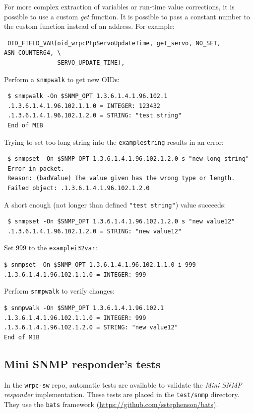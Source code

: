 \documentclass[a4paper, 12pt]{article}
\renewcommand{\_}{\underscore\allowbreak}
\begin{document}
\begin{itemize*}
For more complex extraction of variables or run-time value corrections,
it is possible to use a custom \textit{get} function. It is possible to pass
a constant number to the custom function instead of an address. For example:
\begin{lstlisting}
 OID_FIELD_VAR(oid_wrpcPtpServoUpdateTime, get_servo, NO_SET, ASN_COUNTER64, \
               SERVO_UPDATE_TIME),
\end{lstlisting}

\end{itemize*}
Perform a \texttt{snmpwalk} to get new OIDs:
\begin{lstlisting}
 $ snmpwalk -On $SNMP_OPT 1.3.6.1.4.1.96.102.1
 .1.3.6.1.4.1.96.102.1.1.0 = INTEGER: 123432
 .1.3.6.1.4.1.96.102.1.2.0 = STRING: "test string"
 End of MIB
\end{lstlisting}
Trying to set too long string into the \texttt{example\_string} results in an error:
\begin{lstlisting}
 $ snmpset -On $SNMP_OPT 1.3.6.1.4.1.96.102.1.2.0 s "new long string"
 Error in packet.
 Reason: (badValue) The value given has the wrong type or length.
 Failed object: .1.3.6.1.4.1.96.102.1.2.0
\end{lstlisting}
A short enough (not longer than defined \texttt{"test string"}) value succeeds:
\begin{lstlisting}
 $ snmpset -On $SNMP_OPT 1.3.6.1.4.1.96.102.1.2.0 s "new value12"
 .1.3.6.1.4.1.96.102.1.2.0 = STRING: "new value12"
\end{lstlisting}
Set 999 to the \texttt{example\_i32var}:
\begin{lstlisting}
$ snmpset -On $SNMP_OPT 1.3.6.1.4.1.96.102.1.1.0 i 999
.1.3.6.1.4.1.96.102.1.1.0 = INTEGER: 999
\end{lstlisting}
Perform \texttt{snmpwalk} to verify changes:
\begin{lstlisting}
$ snmpwalk -On $SNMP_OPT 1.3.6.1.4.1.96.102.1
.1.3.6.1.4.1.96.102.1.1.0 = INTEGER: 999
.1.3.6.1.4.1.96.102.1.2.0 = STRING: "new value12"
End of MIB
\end{lstlisting}

\subsection{Mini SNMP responder's tests}
\label{Mini SNMP responder's tests}

In the \texttt{wrpc-sw} repo, automatic tests are available to validate the \textit{Mini
SNMP responder} implementation. These tests are placed in the \texttt{test/snmp}
directory.
They use the \texttt{bats} framework (\url{https://github.com/sstephenson/bats}).
\end{document}
